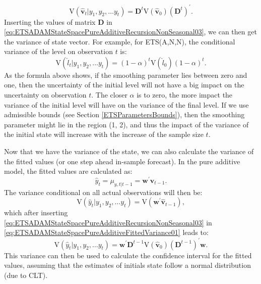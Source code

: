 \documentclass[
]{book}
\theoremstyle{definition}
\theoremstyle{definition}
\theoremstyle{definition}
\theoremstyle{definition}
\theoremstyle{remark}
\begin{document}
\begin{equation}
    \mathrm{V}(\hat{\mathbf{v}}_{t} | y_1, y_2, \dots y_t) = \mathbf{D}^{t} \mathrm{V}\left( \hat{\mathbf{v}}_{0} \right) \left(\mathbf{D}^{t}\right)^\prime .
  \label{eq:ETSADAMStateSpacePureAdditiveRecursionNonSeasonal03}
\end{equation}
Inserting the values of matrix \(\mathbf{D}\) in \eqref{eq:ETSADAMStateSpacePureAdditiveRecursionNonSeasonal03}, we can then get the variance of state vector. For example, for ETS(A,N,N), the conditional variance of the level on observation \(t\) is:
\begin{equation}
    \mathrm{V}(\hat{l}_{t} | y_1, y_2, \dots y_t) = (1-\alpha)^{t} \mathrm{V}\left( \hat{l}_{0} \right) (1-\alpha)^{t} .
  \label{eq:ETSADAMStateSpacePureAdditiveRecursionANN}
\end{equation}
As the formula above shows, if the smoothing parameter lies between zero and one, then the uncertainty of the initial level will not have a big impact on the uncertainty on observation \(t\). The closer \(\alpha\) is to zero, the more impact the variance of the initial level will have on the variance of the final level. If we use admissible bounds (see Section \ref{ETSParametersBounds}), then the smoothing parameter might lie in the region (1, 2), and thus the impact of the variance of the initial state will increase with the increase of the sample size \(t\).

Now that we have the variance of the state, we can also calculate the variance of the fitted values (or one step ahead in-sample forecast). In the pure additive model, the fitted values are calculated as:
\begin{equation}
    \hat{y}_t = \mu_{y,t|t-1} = \mathbf{w}^\prime \hat{\mathbf{v}}_{t-1}.
  \label{eq:ETSADAMStateSpacePureAdditiveFitted}
\end{equation}
The variance conditional on all actual observations will then be:
\begin{equation}
    \mathrm{V}(\hat{y}_t | y_1, y_2, \dots y_t) = \mathrm{V}\left( \mathbf{w}^\prime \hat{\mathbf{v}}_{t-1} \right) ,
  \label{eq:ETSADAMStateSpacePureAdditiveFittedVariance01}
\end{equation}
which after inserting \eqref{eq:ETSADAMStateSpacePureAdditiveRecursionNonSeasonal03} in \eqref{eq:ETSADAMStateSpacePureAdditiveFittedVariance01} leads to:
\begin{equation}
    \mathrm{V}(\hat{y}_t | y_1, y_2, \dots y_t) = \mathbf{w}^\prime \mathbf{D}^{t-1} \mathrm{V}\left( \hat{\mathbf{v}}_{0} \right) \left(\mathbf{D}^{t-1}\right)^\prime \mathbf{w} .
  \label{eq:ETSADAMStateSpacePureAdditiveFittedVariance02}
\end{equation}
This variance can then be used to calculate the confidence interval for the fitted values, assuming that the estimates of initials state follow a normal distribution (due to CLT).
\end{document}
